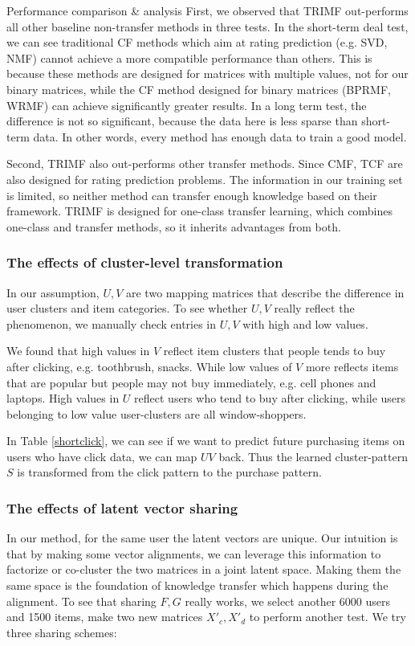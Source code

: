 \begin{section}{Performance comparison \& analysis}
First, we observed that TRIMF out-performs all other baseline non-transfer methods in three tests. In the short-term deal test, we can see traditional CF methods which aim at rating prediction (e.g. SVD, NMF) cannot achieve a more compatible performance than others. This is because these methods are designed for matrices with multiple values, not for our binary matrices, while the CF method designed for binary matrices (BPRMF, WRMF) can achieve significantly greater results. In a long term test, the difference is not so significant, because the data here is less sparse than short-term data. In other words, every method has enough data to train a good model.

Second, TRIMF also out-performs other transfer methods. Since CMF, TCF are also designed for rating prediction problems. The information in our training set is limited, so neither method can transfer enough knowledge based on their framework. TRIMF is designed for one-class transfer learning, which combines one-class and transfer methods, so it inherits advantages from both.


  \subsubsection{The effects of cluster-level transformation}
In our assumption, $U,V$ are two mapping matrices that describe the difference in user clusters and item categories. To see whether $U,V$ really reflect the phenomenon, we manually check entries in $U,V$ with high and low values.

  We found that high values in $V$ reflect item clusters that people tends to buy after clicking, e.g. toothbrush, snacks. While low values of $V$ more reflects items that are popular but people may not buy immediately, e.g. cell phones and laptops. High values in $U$ reflect users who tend to buy after clicking, while users belonging to low value user-clusters are all window-shoppers.

  In Table \ref{shortclick}, we can see if we want to predict future purchasing items on users who have click data, we can map $UV$ back. Thus the learned cluster-pattern $S$ is transformed from the click pattern to the purchase pattern.

  \subsubsection{The effects of latent vector sharing}
  	In our method, for the same user the latent vectors are unique. Our intuition is that by making some vector alignments, we can leverage this information to factorize or co-cluster the two matrices in a joint latent space. Making them the same space is the foundation of knowledge transfer which happens during the alignment.
    To see that sharing $F,G$ really works, we select another 6000 users and 1500 items, make two new matrices $X'_c, X'_d$ to perform another test. We try three sharing schemes: 
    

\end{section}
